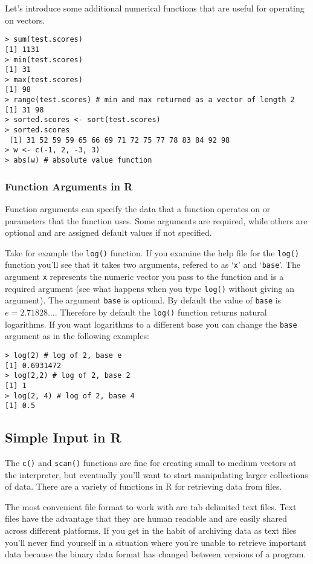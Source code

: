 \documentclass{article}
\begin{document}
Let's introduce some additional numerical functions that are useful for
operating on vectors.

\begin{lstlisting}
> sum(test.scores)
[1] 1131
> min(test.scores)
[1] 31
> max(test.scores)
[1] 98
> range(test.scores) # min and max returned as a vector of length 2
[1] 31 98
> sorted.scores <- sort(test.scores)
> sorted.scores
 [1] 31 52 59 59 65 66 69 71 72 75 77 78 83 84 92 98
> w <- c(-1, 2, -3, 3)
> abs(w) # absolute value function
\end{lstlisting}
\subsubsection{Function Arguments in R}

Function arguments can specify the data that a function operates on or
parameters that the function uses. Some arguments are required, while
others are optional and are assigned default values if not specified.

Take for example the \lstinline!log()! function. If you examine the help
file for the \lstinline!log()! function you'll see that it takes two
arguments, refered to as `\lstinline!x!' and `\lstinline!base!'. The
argument \lstinline!x! represents the numeric vector you pass to the
function and is a required argument (see what happens when you type
\lstinline!log()! without giving an argument). The argument
\lstinline!base! is optional. By default the value of \lstinline!base!
is $e = 2.71828\ldots$. Therefore by default the \lstinline!log()!
function returns natural logarithms. If you want logarithms to a
different base you can change the \lstinline!base! argument as in the
following examples:

\begin{lstlisting}
> log(2) # log of 2, base e
[1] 0.6931472
> log(2,2) # log of 2, base 2
[1] 1
> log(2, 4) # log of 2, base 4
[1] 0.5
\end{lstlisting}
\subsection{Simple Input in R}

The \lstinline!c()! and \lstinline!scan()! functions are fine for
creating small to medium vectors at the interpreter, but eventually
you'll want to start manipulating larger collections of data. There are
a variety of functions in R for retrieving data from files.

The most convenient file format to work with are tab delimited text
files. Text files have the advantage that they are human readable and
are easily shared across different platforms. If you get in the habit of
archiving data as text files you'll never find yourself in a situation
where you're unable to retrieve important data because the binary data
format has changed between versions of a program.
\end{document}
